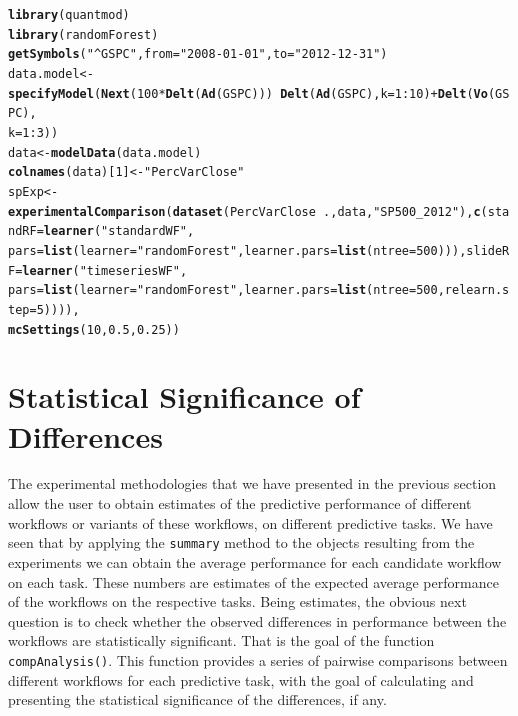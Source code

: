 \documentclass[10pt,a4paper]{article}\usepackage[]{graphicx}\usepackage[]{color}
\makeatletter
\newcommand{\hlnum}[1]{\textcolor[rgb]{0.686,0.059,0.569}{#1}}%
\newcommand{\hlstr}[1]{\textcolor[rgb]{0.192,0.494,0.8}{#1}}%
\newcommand{\hlopt}[1]{\textcolor[rgb]{0,0,0}{#1}}%
\newcommand{\hlstd}[1]{\textcolor[rgb]{0.345,0.345,0.345}{#1}}%
\newcommand{\hlkwb}[1]{\textcolor[rgb]{0.69,0.353,0.396}{#1}}%
\newcommand{\hlkwc}[1]{\textcolor[rgb]{0.333,0.667,0.333}{#1}}%
\newcommand{\hlkwd}[1]{\textcolor[rgb]{0.737,0.353,0.396}{\textbf{#1}}}%
\newenvironment{kframe}{%
 \def\at@end@of@kframe{}%
 \ifinner\ifhmode%
  \def\at@end@of@kframe{\end{minipage}}%
  \begin{minipage}{\columnwidth}%
 \fi\fi%
 \def\FrameCommand##1{\hskip\@totalleftmargin \hskip-\fboxsep
 \colorbox{shadecolor}{##1}\hskip-\fboxsep
     \hskip-\linewidth \hskip-\@totalleftmargin \hskip\columnwidth}%
 \MakeFramed {\advance\hsize-\width
   \@totalleftmargin\z@ \linewidth\hsize
   \@setminipage}}%
 {\par\unskip\endMakeFramed%
 \at@end@of@kframe}
\newenvironment{knitrout}{}{} %
\makeatother
\begin{document}
\begin{knitrout}
\color{fgcolor}\begin{kframe}
\begin{alltt}
\hlkwd{library}\hlstd{(quantmod)}
\hlkwd{library}\hlstd{(randomForest)}
\hlkwd{getSymbols}\hlstd{(}\hlstr{"^GSPC"}\hlstd{,} \hlkwc{from} \hlstd{=} \hlstr{"2008-01-01"}\hlstd{,} \hlkwc{to} \hlstd{=} \hlstr{"2012-12-31"}\hlstd{)}
\hlstd{data.model} \hlkwb{<-} \hlkwd{specifyModel}\hlstd{(}\hlkwd{Next}\hlstd{(}\hlnum{100} \hlopt{*} \hlkwd{Delt}\hlstd{(}\hlkwd{Ad}\hlstd{(GSPC)))} \hlopt{~} \hlkwd{Delt}\hlstd{(}\hlkwd{Ad}\hlstd{(GSPC),} \hlkwc{k} \hlstd{=} \hlnum{1}\hlopt{:}\hlnum{10}\hlstd{)} \hlopt{+} \hlkwd{Delt}\hlstd{(}\hlkwd{Vo}\hlstd{(GSPC),}
    \hlkwc{k} \hlstd{=} \hlnum{1}\hlopt{:}\hlnum{3}\hlstd{))}
\hlstd{data} \hlkwb{<-} \hlkwd{modelData}\hlstd{(data.model)}
\hlkwd{colnames}\hlstd{(data)[}\hlnum{1}\hlstd{]} \hlkwb{<-} \hlstr{"PercVarClose"}
\hlstd{spExp} \hlkwb{<-} \hlkwd{experimentalComparison}\hlstd{(}\hlkwd{dataset}\hlstd{(PercVarClose} \hlopt{~} \hlstd{., data,} \hlstr{"SP500_2012"}\hlstd{),} \hlkwd{c}\hlstd{(}\hlkwc{standRF} \hlstd{=} \hlkwd{learner}\hlstd{(}\hlstr{"standardWF"}\hlstd{,}
    \hlkwc{pars} \hlstd{=} \hlkwd{list}\hlstd{(}\hlkwc{learner} \hlstd{=} \hlstr{"randomForest"}\hlstd{,} \hlkwc{learner.pars} \hlstd{=} \hlkwd{list}\hlstd{(}\hlkwc{ntree} \hlstd{=} \hlnum{500}\hlstd{))),} \hlkwc{slideRF} \hlstd{=} \hlkwd{learner}\hlstd{(}\hlstr{"timeseriesWF"}\hlstd{,}
    \hlkwc{pars} \hlstd{=} \hlkwd{list}\hlstd{(}\hlkwc{learner} \hlstd{=} \hlstr{"randomForest"}\hlstd{,} \hlkwc{learner.pars} \hlstd{=} \hlkwd{list}\hlstd{(}\hlkwc{ntree} \hlstd{=} \hlnum{500}\hlstd{,} \hlkwc{relearn.step} \hlstd{=} \hlnum{5}\hlstd{)))),}
    \hlkwd{mcSettings}\hlstd{(}\hlnum{10}\hlstd{,} \hlnum{0.5}\hlstd{,} \hlnum{0.25}\hlstd{))}
\end{alltt}
\end{kframe}
\end{knitrout}




\section{Statistical Significance of Differences}

The experimental methodologies that we have presented in the previous
section allow the user to obtain estimates of the predictive
performance of different workflows or variants of these workflows, on
different predictive tasks. We have seen that by applying the
\texttt{summary} method to the objects resulting from the experiments
we can obtain the average performance for each candidate workflow on
each task. These numbers are estimates of the expected average
performance of the workflows on the respective tasks. Being estimates,
the obvious next question is to check whether the observed differences
in performance between the workflows are statistically
significant. That is the goal of the function
\texttt{compAnalysis()}. This function provides a series of pairwise
comparisons between different workflows for each predictive task, with
the goal of calculating and presenting the statistical significance of
the differences, if any.
\end{document}
